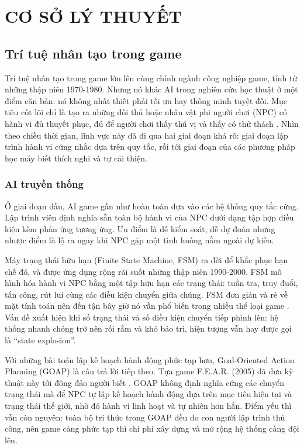 \fontsize{13pt}{22.5pt}\selectfont

\clearpage
\section{CƠ SỞ LÝ THUYẾT}
\label{ch:theory}

\subsection{Trí tuệ nhân tạo trong game}
\indent Trí tuệ nhân tạo trong game lớn lên cùng chính ngành công nghiệp game, tính từ
những thập niên 1970-1980. Nhưng nó khác AI trong nghiên cứu học thuật ở một điểm căn
bản: nó không nhất thiết phải tối ưu hay thông minh tuyệt đối. Mục tiêu cốt lõi chỉ là
tạo ra những đối thủ hoặc nhân vật phi người chơi (NPC) có hành vi đủ thuyết phục, đủ để
người chơi thấy thú vị và thấy có thử thách \cite{millington2019ai}. Nhìn theo chiều thời
gian, lĩnh vực này đã đi qua hai giai đoạn khá rõ: giai đoạn lập trình hành vi cứng nhắc
dựa trên quy tắc, rồi tới giai đoạn của các phương pháp học máy biết thích nghi và tự
cải thiện.

\subsubsection{AI truyền thống}
\indent Ở giai đoạn đầu, AI game gần như hoàn toàn dựa vào các hệ thống quy tắc cứng. Lập trình viên định nghĩa sẵn toàn bộ hành vi của NPC dưới dạng
tập hợp điều kiện kèm phản ứng tương ứng. Ưu điểm là dễ kiểm soát, dễ dự đoán nhưng nhược điểm là lộ ra ngay khi NPC gặp một tình huống nằm ngoài dự kiến.

\indent Máy trạng thái hữu hạn (Finite State Machine, FSM) ra đời để khắc phục hạn chế
đó, và được ứng dụng rộng rãi suốt những thập niên 1990-2000. FSM mô hình hóa hành vi NPC
bằng một tập hữu hạn các trạng thái: tuần tra, truy đuổi, tấn công, rút lui cùng các
điều kiện chuyển giữa chúng. FSM đơn giản và rẻ về mặt tính toán nên đến tận bây giờ nó vẫn
phổ biến trong nhiều thể loại game \cite{millington2019ai}. Vấn đề xuất hiện khi số
trạng thái và số điều kiện chuyển tiếp phình lên: hệ thống nhanh chóng trở nên rối rắm và
khó bảo trì, hiện tượng vẫn hay được gọi là ``state explosion''.

\indent Với những bài toán lập kế hoạch hành động phức tạp hơn, Goal-Oriented Action
Planning (GOAP) là câu trả lời tiếp theo. Tựa game F.E.A.R. (2005) đã đưa kỹ thuật này
tới đông đảo người biết \cite{millington2019ai}. GOAP không định nghĩa cứng các chuyển
trạng thái mà để NPC tự lập kế hoạch hành động dựa trên mục tiêu hiện tại và trạng thái
thế giới, nhờ đó hành vi linh hoạt và tự nhiên hơn hẳn. Điểm yếu thì vẫn còn nguyên: toàn
bộ tri thức trong GOAP đều do con người lập trình thủ công, nên game càng phức tạp thì
chi phí xây dựng và mở rộng hệ thống càng đội lên.

